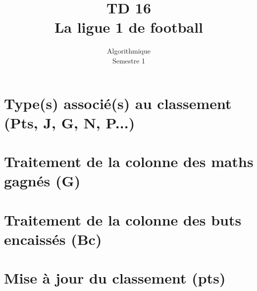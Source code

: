 \documentclass{article}
\title{TD 16\\ La ligue 1 de football}
\date{Algorithmique\\ Semestre 1}
\begin{document}
	\maketitle
	\section{Type(s) associé(s) au classement (Pts, J, G, N, P...)}
		
	\section{Traitement de la colonne des maths gagnés (G)}
		\subsection{}
			
		\subsection{}
			
			
		\subsection{}	
			
		\subsection{}	
			
			
	\section{Traitement de la colonne des buts encaissés (Bc)}
		\subsection{}
			
			
	\section{Mise à jour du classement (pts)}
		\subsection{}
			
		\subsection{}
			
		\subsection{}
			

			
\end{document}
